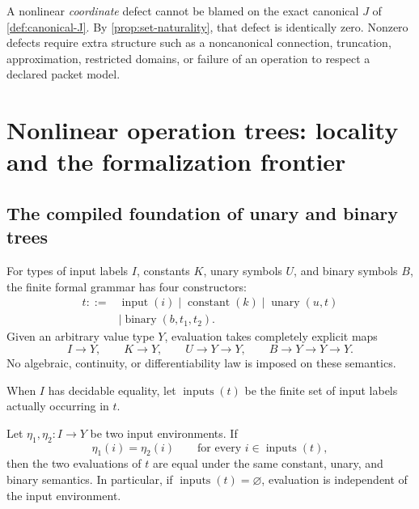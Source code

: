 \begin{boundary}
A nonlinear \emph{coordinate} defect cannot be blamed on the exact canonical
$J$ of \cref{def:canonical-J}. By \cref{prop:set-naturality}, that defect is
identically zero.  Nonzero defects require extra structure such as a
noncanonical connection, truncation, approximation, restricted domains, or
failure of an operation to respect a declared packet model.
\end{boundary}

\clearpage\section{Nonlinear operation trees: locality and the formalization frontier}
\label{sec:operation-trees}

\subsection{The compiled foundation of unary and binary trees}

\begin{definition}
\label{def:compiled-operation-tree}
For types of input labels $I$, constants $K$, unary symbols $U$, and binary
symbols $B$, the finite formal grammar has four constructors:
\[
\begin{aligned}
t ::={}&\operatorname{input}(i)
\mid\operatorname{constant}(k)
\mid\operatorname{unary}(u,t)\\
&\mid\operatorname{binary}(b,t_1,t_2).
\end{aligned}
\]
Given an arbitrary value type $Y$, evaluation takes completely explicit maps
\[
I\to Y,\qquad K\to Y,\qquad U\to Y\to Y,\qquad
B\to Y\to Y\to Y.
\]
No algebraic, continuity, or differentiability law is imposed on these
semantics.
\end{definition}

When $I$ has decidable equality, let $\operatorname{inputs}(t)$ be the finite
set of input labels actually occurring in $t$.

\begin{theorem}
\label{thm:tree-locality}
Let $\eta_1,\eta_2:I\to Y$ be two input environments.  If
\[
\eta_1(i)=\eta_2(i)
\qquad\text{for every }i\in\operatorname{inputs}(t),
\]
then the two evaluations of $t$ are equal under the same constant, unary, and
binary semantics.  In particular, if
$\operatorname{inputs}(t)=\varnothing$, evaluation is independent of the
input environment.
\end{theorem}

